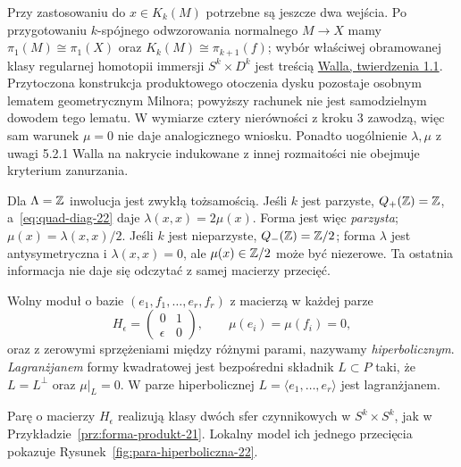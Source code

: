 Przy zastosowaniu do $x\in K_k(M)$ potrzebne są
jeszcze dwa wejścia. Po przygotowaniu
$k$-spójnego odwzorowania normalnego $M\to X$ mamy
$\pi_1(M)\cong\pi_1(X)$ oraz
$K_k(M)\cong\pi_{k+1}(f)$; wybór właściwej
obramowanej klasy regularnej homotopii immersji
$S^k\times D^k$ jest treścią
\href{https://webhomes.maths.ed.ac.uk/~v1ranick/books/scm.pdf}
{Walla, twierdzenia 1.1}. Przytoczona konstrukcja
produktowego otoczenia dysku pozostaje osobnym
lematem geometrycznym Milnora; powyższy rachunek
nie jest samodzielnym dowodem tego lematu.
W wymiarze cztery nierówności z kroku 3 zawodzą,
więc sam warunek $\mu=0$ nie daje analogicznego
wniosku. Ponadto uogólnienie $\lambda,\mu$ z
uwagi 5.2.1 Walla na nakrycie indukowane z innej
rozmaitości nie obejmuje kryterium zanurzania.

\begin{przyklad}[Co zostaje, gdy $\pi=1$]
\label{prz:mu-Z-22}
Dla $\Lambda=\mathbb{Z}$ inwolucja jest zwykłą tożsamością.
Jeśli $k$ jest parzyste, $Q_+(\mathbb{Z})=\mathbb{Z}$,
a~\eqref{eq:quad-diag-22} daje
$\lambda(x,x)=2\mu(x)$. Forma jest więc
\emph{parzysta}; $\mu(x)=\lambda(x,x)/2$.
Jeśli $k$ jest nieparzyste,
$Q_-(\mathbb{Z})=\mathbb{Z}/2$; forma $\lambda$ jest
antysymetryczna i $\lambda(x,x)=0$,
ale $\mu(x)\in\mathbb{Z}/2$ może być niezerowe.
Ta ostatnia informacja nie daje się odczytać
z samej macierzy przecięć.
\end{przyklad}

\begin{definicja}
\label{def:hiperboliczna-22}
Wolny moduł o bazie $(e_1,f_1,\dots,e_r,f_r)$
z macierzą w każdej parze
\[
 H_\epsilon=
 \begin{pmatrix}0&1\\\epsilon&0\end{pmatrix},
 \qquad \mu(e_i)=\mu(f_i)=0,
\]
oraz z zerowymi sprzężeniami między różnymi
parami, nazywamy \emph{hiperbolicznym}.
\emph{Lagranżjanem} formy kwadratowej jest
bezpośredni składnik $L\subset P$ taki, że
$L=L^\perp$ oraz $\mu|_L=0$.
W parze hiperbolicznej
$L=\langle e_1,\dots,e_r\rangle$ jest lagranżjanem.
\end{definicja}

Parę o macierzy $H_\epsilon$ realizują klasy
dwóch sfer czynnikowych w $S^k\times S^k$,
jak w Przykładzie~\ref{prz:forma-produkt-21}.
Lokalny model ich jednego przecięcia
pokazuje Rysunek~\ref{fig:para-hiperboliczna-22}.

